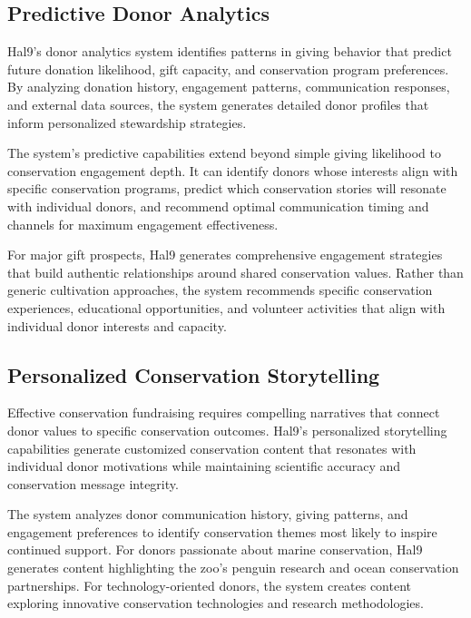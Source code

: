 \documentclass[
  Letterpaper,
]{scrbook}
\begin{document}
\subsection{Predictive Donor
Analytics}\label{predictive-donor-analytics}

Hal9's donor analytics system identifies patterns in giving behavior
that predict future donation likelihood, gift capacity, and conservation
program preferences. By analyzing donation history, engagement patterns,
communication responses, and external data sources, the system generates
detailed donor profiles that inform personalized stewardship strategies.

The system's predictive capabilities extend beyond simple giving
likelihood to conservation engagement depth. It can identify donors
whose interests align with specific conservation programs, predict which
conservation stories will resonate with individual donors, and recommend
optimal communication timing and channels for maximum engagement
effectiveness.

For major gift prospects, Hal9 generates comprehensive engagement
strategies that build authentic relationships around shared conservation
values. Rather than generic cultivation approaches, the system
recommends specific conservation experiences, educational opportunities,
and volunteer activities that align with individual donor interests and
capacity.

\subsection{Personalized Conservation
Storytelling}\label{personalized-conservation-storytelling}

Effective conservation fundraising requires compelling narratives that
connect donor values to specific conservation outcomes. Hal9's
personalized storytelling capabilities generate customized conservation
content that resonates with individual donor motivations while
maintaining scientific accuracy and conservation message integrity.

The system analyzes donor communication history, giving patterns, and
engagement preferences to identify conservation themes most likely to
inspire continued support. For donors passionate about marine
conservation, Hal9 generates content highlighting the zoo's penguin
research and ocean conservation partnerships. For technology-oriented
donors, the system creates content exploring innovative conservation
technologies and research methodologies.
\end{document}
